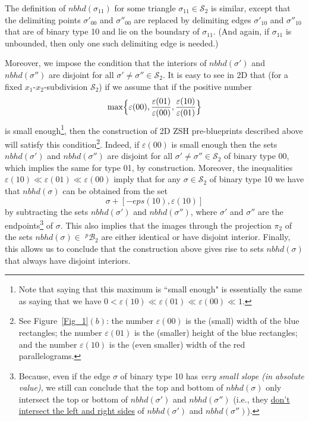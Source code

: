 \documentclass[12pt,letterpaper]{article}
\renewcommand{\S}{\mathcal{S}}
\newcommand{\B}{\mathcal{B}}
\newcommand{\eps}{\varepsilon}
\newcommand{\nbhd}{\mathit{nbhd}}
\begin{document}
\noindent
The definition of $\nbhd(\sigma_{11})$ for some triangle $\sigma_{11} \in \S_2$ is similar, except that the delimiting points $\sigma'_{00}$ and $\sigma''_{00}$ are replaced by delimiting edges $\sigma'_{10}$ and $\sigma''_{10}$ that are of binary type 10 and lie on the boundary of $\sigma_{11}$. (And again, if $\sigma_{11}$ is unbounded, then only one such delimiting edge is needed.)

\noindent
Moreover, we impose the condition that the interiors of $\nbhd(\sigma')$ and $\nbhd(\sigma'')$ are disjoint for all $\sigma' \neq \sigma'' \in \S_2$. It is easy to see in 2D that (for a fixed $x_1$-$x_2$-subdivision $\S_2$) if we assume that if the positive number
$$
\max \Bigl\{  \eps(00), \frac{\eps(01)}{\eps(00)}, \frac{\eps(10)}{\eps(01)}  \Bigr\}
$$
is small enough\footnote{Note that saying that this maximum is ``small enough" is essentially the same as saying that we have 
$
0 < \eps(10) \ll \eps(01) \ll \eps(00) \ll 1 
$.
}, then the construction of 2D ZSH pre-blueprints described above will satisfy this condition\footnote{See Figure~\ref{Fig_1}$(b)$: the number $\eps(00)$ is the (small) width of the blue rectangles;  the number $\eps(01)$ is the (smaller) height of the blue rectangles;  and  the number $\eps(10)$ is the (even smaller) width of the red parallelograms.}. Indeed, if $\eps(00)$ is small enough then the sets $\nbhd(\sigma')$ and $\nbhd(\sigma'')$ are disjoint for all $\sigma' \neq \sigma'' \in \S_2$ of binary type 00, which implies the same for type 01, by construction. Moreover, the inequalities $\eps(10) \ll \eps(01) \ll \eps(00)$ imply that  for any  $\sigma \in \S_2$ of binary type 10 we have that $\nbhd(\sigma)$ can be obtained from the set 
$$
\sigma + [-eps(10), \eps(10)]
$$
by subtracting the sets $\nbhd(\sigma')$ and $\nbhd(\sigma'')$, where $\sigma'$ and $\sigma''$ are the endpoints\footnote{Because, even if the edge $\sigma$ of binary type 10 has {\em very small slope (in absolute value)}, we still can conclude that the top and bottom of $\nbhd(\sigma)$ only intersect the top or bottom of $\nbhd(\sigma')$ and $\nbhd(\sigma'')$ (i.e., they \ul{don't intersect the left and right sides} of $\nbhd(\sigma')$ and $\nbhd(\sigma'')$).} of $\sigma$. 
This also implies that  the images through the projection $\pi_2$ of the sets $\nbhd(\sigma) \in$ $^p\!\B_2$ are either identical or have disjoint interior. Finally, this allows us to conclude that the construction above gives rise to sets $\nbhd(\sigma)$ that always have disjoint interiors. 
\end{document}
